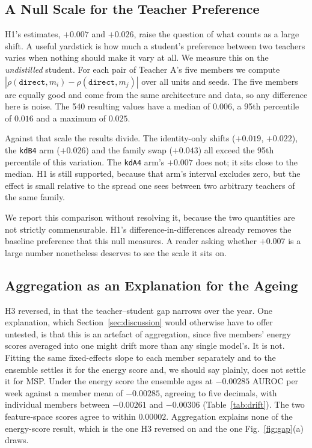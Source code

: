 \documentclass[journal]{IEEEtran}
\newcommand{\kd}[1]{\texttt{#1}}
\begin{document}
\subsection{A Null Scale for the Teacher Preference}
\label{sec:null}

H1's estimates, $+0.007$ and $+0.026$, raise the question of what counts as a large shift. A useful yardstick is how much a student's preference between two teachers varies when nothing should make it vary at all. We measure this on the \emph{undistilled} student. For each pair of Teacher A's five members we compute $|\rho(\kd{direct}, m_i) - \rho(\kd{direct}, m_j)|$ over all units and seeds. The five members are equally good and come from the same architecture and data, so any difference here is noise. The 540 resulting values have a median of $0.006$, a 95th percentile of $0.016$ and a maximum of $0.025$.

Against that scale the results divide. The identity-only shifts ($+0.019$, $+0.022$), the \kd{kdB4} arm ($+0.026$) and the family swap ($+0.043$) all exceed the 95th percentile of this variation. The \kd{kdA4} arm's $+0.007$ does not; it sits close to the median. H1 is still supported, because that arm's interval excludes zero, but the effect is small relative to the spread one sees between two arbitrary teachers of the same family.

We report this comparison without resolving it, because the two quantities are not strictly commensurable. H1's difference-in-differences already removes the baseline preference that this null measures. A reader asking whether $+0.007$ is a large number nonetheless deserves to see the scale it sits on.

\subsection{Aggregation as an Explanation for the Ageing}
\label{sec:drift}

H3 reversed, in that the teacher--student gap narrows over the year. One explanation, which Section~\ref{sec:discussion} would otherwise have to offer untested, is that this is an artefact of aggregation, since five members' energy scores averaged into one might drift more than any single model's. It is not. Fitting the same fixed-effects slope to each member separately and to the ensemble settles it for the energy score and, we should say plainly, does not settle it for MSP. Under the energy score the ensemble ages at $-0.00285$ AUROC per week against a member mean of $-0.00285$, agreeing to five decimals, with individual members between $-0.00261$ and $-0.00306$ (Table~\ref{tab:drift}). The two feature-space scores agree to within $0.00002$. Aggregation explains none of the energy-score result, which is the one H3 reversed on and the one Fig.~\ref{fig:gap}(a) draws.
\end{document}

